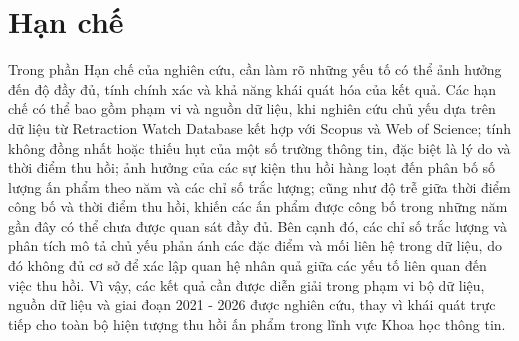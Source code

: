 \section{Hạn chế}

Trong phần Hạn chế của nghiên cứu, cần làm rõ những yếu tố có thể ảnh hưởng đến độ đầy đủ, tính chính xác và khả năng khái quát hóa của kết quả. Các hạn chế có thể bao gồm phạm vi và nguồn dữ liệu, khi nghiên cứu chủ yếu dựa trên dữ liệu từ Retraction Watch Database kết hợp với Scopus và Web of Science; tính không đồng nhất hoặc thiếu hụt của một số trường thông tin, đặc biệt là lý do và thời điểm thu hồi; ảnh hưởng của các sự kiện thu hồi hàng loạt đến phân bố số lượng ấn phẩm theo năm và các chỉ số trắc lượng; cũng như độ trễ giữa thời điểm công bố và thời điểm thu hồi, khiến các ấn phẩm được công bố trong những năm gần đây có thể chưa được quan sát đầy đủ. Bên cạnh đó, các chỉ số trắc lượng và phân tích mô tả chủ yếu phản ánh các đặc điểm và mối liên hệ trong dữ liệu, do đó không đủ cơ sở để xác lập quan hệ nhân quả giữa các yếu tố liên quan đến việc thu hồi. Vì vậy, các kết quả cần được diễn giải trong phạm vi bộ dữ liệu, nguồn dữ liệu và giai đoạn 2021 - 2026 được nghiên cứu, thay vì khái quát trực tiếp cho toàn bộ hiện tượng thu hồi ấn phẩm trong lĩnh vực Khoa học thông tin.